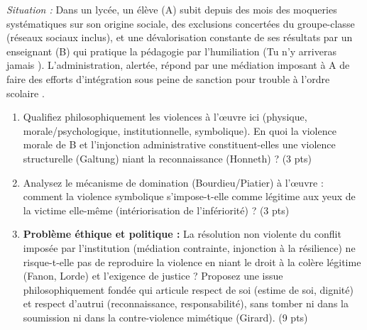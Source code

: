 \documentclass[11pt]{article}
\begin{document}
\begin{exercice}
\textit{Situation :} Dans un lycée, un élève (A) subit depuis des mois des moqueries systématiques sur son origine sociale, des exclusions concertées du groupe-classe (réseaux sociaux inclus), et une dévalorisation constante de ses résultats par un enseignant (B) qui pratique la \og pédagogie par l'humiliation \fg{} (\og Tu n'y arriveras jamais \fg{}). L'administration, alertée, répond par une \og médiation \fg{} imposant à A de \og faire des efforts d'intégration \fg{} sous peine de sanction pour \og trouble à l'ordre scolaire \fg{}.

\begin{enumerate}
    \item Qualifiez philosophiquement les violences à l'œuvre ici (physique, morale/psychologique, institutionnelle, symbolique). En quoi la violence morale de B et l'injonction administrative constituent-elles une \og violence structurelle \fg{} (Galtung) niant la reconnaissance (Honneth) ? (3 pts)
    \item Analysez le mécanisme de \og domination \fg{} (Bourdieu/Piatier) à l'œuvre : comment la violence symbolique s'impose-t-elle comme légitime aux yeux de la victime elle-même (intériorisation de l'infériorité) ? (3 pts)
    \item \textbf{Problème éthique et politique :} La \og résolution non violente du conflit \fg{} imposée par l'institution (médiation contrainte, injonction à la résilience) ne risque-t-elle pas de reproduire la violence en niant le droit à la colère légitime (Fanon, Lorde) et l'exigence de justice ? Proposez une issue philosophiquement fondée qui articule \og respect de soi \fg{} (estime de soi, dignité) et \og respect d'autrui \fg{} (reconnaissance, responsabilité), sans tomber ni dans la soumission ni dans la contre-violence mimétique (Girard). (9 pts)
\end{enumerate}
\end{exercice}
\end{document}
